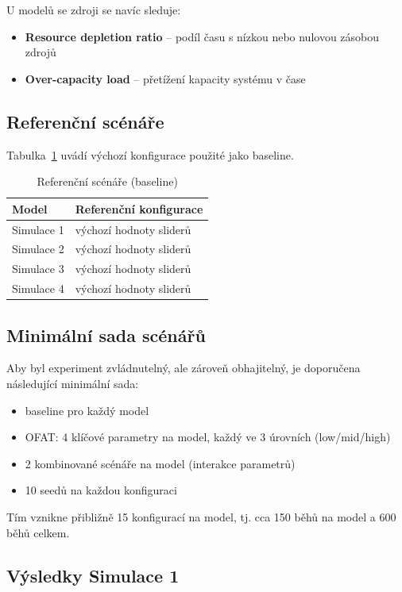 U modelů se zdroji se navíc sleduje:
\begin{itemize}
\item \textbf{Resource depletion ratio} -- podíl času s nízkou nebo nulovou zásobou zdrojů
\item \textbf{Over-capacity load} -- přetížení kapacity systému v čase
\end{itemize}

\subsection{Referenční scénáře}

Tabulka~\ref{tab:baseline} uvádí výchozí konfigurace použité jako baseline.

\begin{table}[h]
\centering
\begin{tabular}{l l}
\hline
\textbf{Model} & \textbf{Referenční konfigurace} \\
\hline
Simulace 1 & výchozí hodnoty sliderů \\
Simulace 2 & výchozí hodnoty sliderů \\
Simulace 3 & výchozí hodnoty sliderů \\
Simulace 4 & výchozí hodnoty sliderů \\
\hline
\end{tabular}
\caption{Referenční scénáře (baseline)}
\label{tab:baseline}
\end{table}

\subsection{Minimální sada scénářů}

Aby byl experiment zvládnutelný, ale zároveň obhajitelný, je doporučena následující minimální sada:
\begin{itemize}
\item baseline pro každý model
\item OFAT: 4 klíčové parametry na model, každý ve 3 úrovních (low/mid/high)
\item 2 kombinované scénáře na model (interakce parametrů)
\item 10 seedů na každou konfiguraci
\end{itemize}

Tím vznikne přibližně 15 konfigurací na model, tj. cca 150 běhů na model a 600 běhů celkem.

\subsection{Výsledky Simulace 1}

